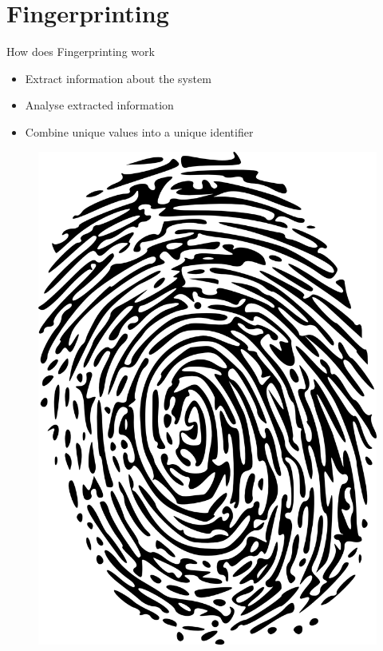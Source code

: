 \documentclass[aspectratio=169]{beamer}
[aspectratio=169] %
\begin{document}
\section{Fingerprinting}

\begin{frame}{How does Fingerprinting work}
  \begin{minipage}{0.49\textwidth} 
    \begin{itemize}
      \item Extract information about the system
      \pause
      \item Analyse extracted information
      \pause
      \item Combine unique values into a unique identifier
    \end{itemize}
  \end{minipage}
  \hfill
  \begin{minipage}{0.49\textwidth} 
    \begin{figure}
      \centering
      \includegraphics[height=0.5\textheight]{figures/fingerprint.png}
    \end{figure}
  \end{minipage}
\end{frame}
\end{document}
